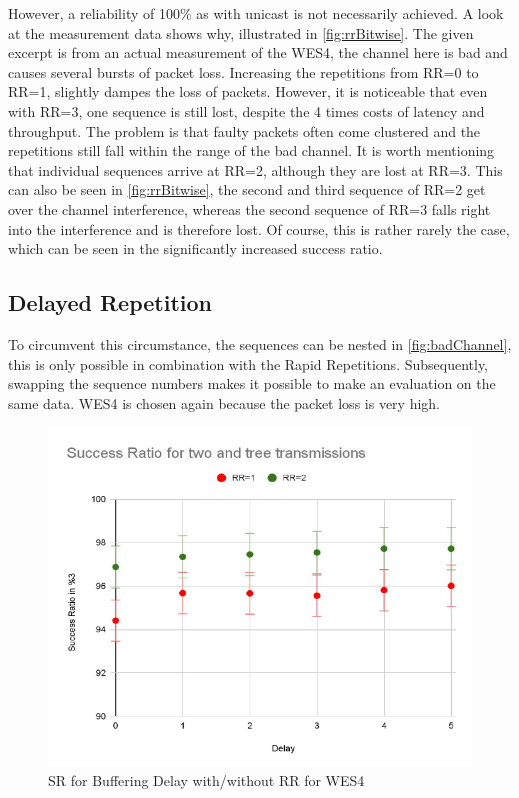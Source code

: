 However, a reliability of 100\% as with unicast is not necessarily achieved.
A look at the measurement data shows why, illustrated in \cref{fig:rrBitwise}.
The given excerpt is from an actual measurement of the WES4, 
the channel here is bad and causes several bursts of packet loss.
Increasing the repetitions from RR=0 to RR=1, slightly dampes the loss of packets.
However, it is noticeable that even with RR=3,
one sequence is still lost, despite the 4 times costs of latency and throughput.
The problem is that faulty packets often come clustered 
and the repetitions still fall within the range of the bad channel.
It is worth mentioning that individual sequences arrive at RR=2, although they are lost at RR=3.
This can also be seen in \cref{fig:rrBitwise}, 
the second and third sequence of RR=2 get over the channel interference,
whereas the second sequence of RR=3 falls right into the interference and is therefore lost.
Of course, this is rather rarely the case, 
which can be seen in the significantly increased success ratio.

\subsection*{Delayed Repetition}

To circumvent this circumstance, the sequences can be nested in \cref{fig:badChannel},
this is only possible in combination with the Rapid Repetitions.
Subsequently, swapping the sequence numbers makes it possible to make an evaluation on the same data.
WES4 is chosen again because the packet loss is very high.

\begin{figure}[h]
	\centering
	\includegraphics[scale=0.8]{figures/bufferingDelay.pdf}
	\caption{SR for Buffering Delay with/without RR for WES4}
	\label{fig:bufferingDelay}
\end{figure}

